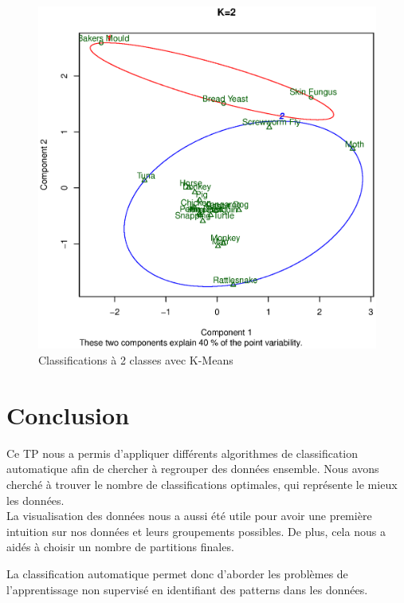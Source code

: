 \documentclass{article}
\begin{document}
\begin{figure}[H]
\centering
\includegraphics[scale=0.48]{./img/mut_clusplot_k2.eps}
\caption{Classifications à 2 classes avec K-Means}
\label{mut_clusplot_k2}
\end{figure}












\section*{Conclusion}
Ce TP nous a permis d'appliquer différents algorithmes de classification automatique afin de chercher à regrouper des données ensemble. Nous avons cherché à trouver le nombre de classifications optimales, qui représente le mieux les données.\\
La visualisation des données nous a aussi été utile pour avoir une première intuition sur nos données et leurs groupements possibles. De plus, cela nous a aidés à choisir un nombre de partitions finales.

La classification automatique permet donc d'aborder les problèmes de l'apprentissage non supervisé en identifiant des patterns dans les données.
\end{document}
